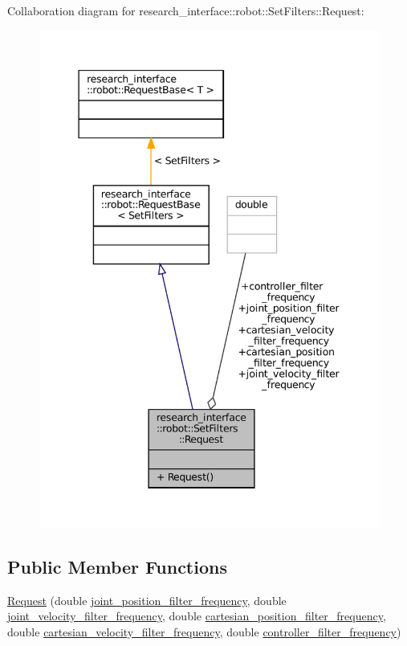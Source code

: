 Collaboration diagram for research\+\_\+interface\+:\+:robot\+:\+:Set\+Filters\+:\+:Request\+:
\nopagebreak
\begin{figure}[H]
\begin{center}
\leavevmode
\includegraphics[width=344pt]{structresearch__interface_1_1robot_1_1SetFilters_1_1Request__coll__graph}
\end{center}
\end{figure}
\subsection*{Public Member Functions}
\begin{DoxyCompactItemize}
\item 
\hyperlink{structresearch__interface_1_1robot_1_1SetFilters_1_1Request_af1168f285d6455b9a64395146ee9498f}{Request} (double \hyperlink{structresearch__interface_1_1robot_1_1SetFilters_1_1Request_a860f89da9defdcc600d13ecf9f48593f}{joint\+\_\+position\+\_\+filter\+\_\+frequency}, double \hyperlink{structresearch__interface_1_1robot_1_1SetFilters_1_1Request_a5da8f47649157c38440941e8a55eb263}{joint\+\_\+velocity\+\_\+filter\+\_\+frequency}, double \hyperlink{structresearch__interface_1_1robot_1_1SetFilters_1_1Request_a9b718eefa760ad1ef370c41a4573e504}{cartesian\+\_\+position\+\_\+filter\+\_\+frequency}, double \hyperlink{structresearch__interface_1_1robot_1_1SetFilters_1_1Request_add0117259ca298a78e3f51784a5eed26}{cartesian\+\_\+velocity\+\_\+filter\+\_\+frequency}, double \hyperlink{structresearch__interface_1_1robot_1_1SetFilters_1_1Request_a0722f3d1bcfbd280c440f1a0762d9541}{controller\+\_\+filter\+\_\+frequency})
\end{DoxyCompactItemize}

